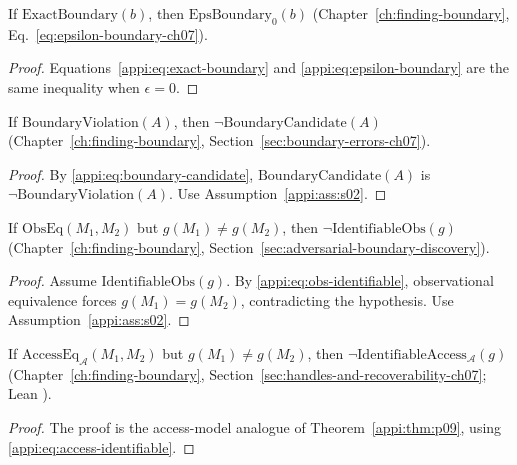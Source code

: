 \begin{lemma}
\label{appi:lem:p07}
If \(\mathrm{ExactBoundary}(b)\), then \(\mathrm{EpsBoundary}_{0}(b)\) (Chapter~\ref{ch:finding-boundary}, Eq.~\eqref{eq:epsilon-boundary-ch07}).
\end{lemma}
\begin{proof}
Equations~\eqref{appi:eq:exact-boundary} and \eqref{appi:eq:epsilon-boundary} are the same inequality when \(\epsilon=0\).
\end{proof}

\begin{lemma}
\label{appi:lem:p08}
If \(\mathrm{BoundaryViolation}(A)\), then \(\neg\mathrm{BoundaryCandidate}(A)\) (Chapter~\ref{ch:finding-boundary}, Section~\ref{sec:boundary-errors-ch07}).
\end{lemma}
\begin{proof}
By \eqref{appi:eq:boundary-candidate}, \(\mathrm{BoundaryCandidate}(A)\) is \(\neg\mathrm{BoundaryViolation}(A)\). Use Assumption~\ref{appi:ass:s02}.
\end{proof}

\begin{theorem}
\label{appi:thm:p09}
If \(\mathrm{ObsEq}(M_1,M_2)\) but \(g(M_1)\neq g(M_2)\), then \(\neg\mathrm{IdentifiableObs}(g)\) (Chapter~\ref{ch:finding-boundary}, Section~\ref{sec:adversarial-boundary-discovery}).
\end{theorem}
\begin{proof}
Assume \(\mathrm{IdentifiableObs}(g)\). By \eqref{appi:eq:obs-identifiable}, observational equivalence forces \(g(M_1)=g(M_2)\), contradicting the hypothesis. Use Assumption~\ref{appi:ass:s02}.
\end{proof}

\begin{theorem}
\label{appi:thm:p34a}
If \(\mathrm{AccessEq}_{\mathcal A}(M_1,M_2)\) but \(g(M_1)\neq g(M_2)\), then \(\neg\mathrm{IdentifiableAccess}_{\mathcal A}(g)\) (Chapter~\ref{ch:finding-boundary}, Section~\ref{sec:handles-and-recoverability-ch07}; Lean ).
\end{theorem}
\begin{proof}
The proof is the access-model analogue of Theorem~\ref{appi:thm:p09}, using \eqref{appi:eq:access-identifiable}.
\end{proof}

